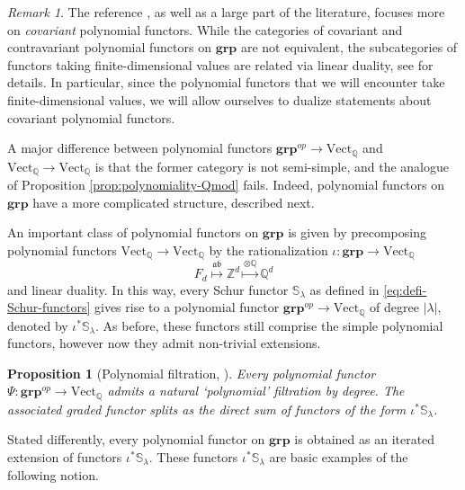 \documentclass[12pt]{article}
\newcommand{\Q}{\mathbb{Q}}
\newcommand{\Schur}[1]{\mathbb{S}_{#1}}
\newcommand{\Vect}[1]{\textrm{Vect}_{#1}}
\theoremstyle{plain}
\newtheorem{prop}[thm]{Proposition}
\theoremstyle{definition}
\theoremstyle{remark}
\newtheorem{rmk}[thm]{Remark}
\begin{document}
\begin{rmk}
    The reference \cite[\S 3]{HPV15}, as well as a large part of the literature, focuses more on \emph{covariant} polynomial functors. While the categories of covariant and contravariant polynomial functors on $\bm{grp}$ are not equivalent, the subcategories of functors taking finite-dimensional values are related via linear duality, see \cite[\S 7]{Pow21} for details. %
    In particular, since the polynomial functors that we will encounter take finite-dimensional values, we will allow ourselves to dualize statements about covariant polynomial functors. %
\end{rmk}

A major difference between polynomial functors $\bm{grp}^{op}\to \Vect{\Q} $ and  $\Vect{\Q}\to \Vect{\Q}$ is that the former category is not semi-simple, and the analogue of Proposition \ref{prop:polynomiality-Qmod} fails. Indeed, polynomial functors on $\bm{grp}$ have a more complicated structure, described next.

An important class of polynomial functors on $\bm{grp}$ is given by precomposing polynomial functors $\Vect{\Q}\to\Vect{\Q}$ by the rationalization $\iota\colon\bm{grp}\to \Vect{\Q}$
\[
F_d \overset{\mathfrak{ab}}\longmapsto \mathbb{Z}^d \overset{\otimes \Q}\longmapsto \Q^d
\]
and linear duality. In this way, every Schur functor $\Schur{\lambda}$ as defined in \eqref{eq:defi-Schur-functors} gives rise to a polynomial functor $\bm{grp}^{op}\to \Vect{\Q}$ of degree $|\lambda|$, denoted by $\iota^* \Schur{\lambda}$. As before, these functors still comprise the simple polynomial functors, however now they admit non-trivial extensions.

\begin{prop}[{Polynomial filtration, \cite[Corollaires 3.6, 3.7]{DV15}}] %
    Every polynomial functor $\Psi: \bm{grp}^{op}\to \Vect{\Q}$ admits a natural `polynomial' filtration by degree. %
    The associated graded functor splits as the direct sum of functors of the form $\iota^* \Schur{\lambda}$.
\end{prop}

Stated differently, every polynomial functor on $\bm{grp}$ is obtained as an iterated extension of functors $\iota^* \Schur{\lambda}$. These functors $\iota^* \Schur{\lambda}$ are basic examples of the following notion.
\end{document}
